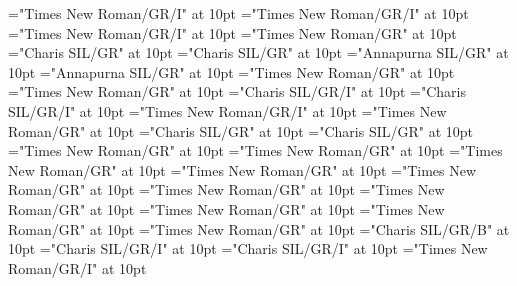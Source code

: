\documentclass[a4paper]{article}
\begin{document}
\font\grammaticalinfoentryletData="Times New Roman/GR/I" at 10pt
\font\partofspeechengrammaticalinfoentryletData="Times New Roman/GR/I" at 10pt
\font\spanenpartofspeechengrammaticalinfoentryletData="Times New Roman/GR/I" at 10pt
\font\xsensenumbersensesensesentryletData="Times New Roman/GR" at 10pt
\font\xitemteLexSensepublishStemGlossPubLdtesensesensesentryletData="Charis SIL/GR" at 10pt
\font\spantexitemteLexSensepublishStemGlossPubLdtesensesensesentryletData="Charis SIL/GR" at 10pt
\font\xitemhiLexSensepublishStemGlossPubLdtesensesensesentryletData="Annapurna SIL/GR" at 10pt
\font\spanhixitemhiLexSensepublishStemGlossPubLdtesensesensesentryletData="Annapurna SIL/GR" at 10pt
\font\examplessensesensesentryletData="Times New Roman/GR" at 10pt
\font\xitemexamplessensesensesentryletData="Times New Roman/GR" at 10pt
\font\exampleggoTeluINxitemexamplessensesensesentryletData="Charis SIL/GR/I" at 10pt
\font\spanggoTeluINexampleggoTeluINxitemexamplessensesensesentryletData="Charis SIL/GR/I" at 10pt
\font\spanenexampleggoTeluINxitemexamplessensesensesentryletData="Times New Roman/GR/I" at 10pt
\font\translationsxitemexamplessensesensesentryletData="Times New Roman/GR" at 10pt
\font\translationLdtetranslationsxitemexamplessensesensesentryletData="Charis SIL/GR" at 10pt
\font\spantetranslationLdtetranslationsxitemexamplessensesensesentryletData="Charis SIL/GR" at 10pt
\font\spanentranslationLdtetranslationsxitemexamplessensesensesentryletData="Times New Roman/GR" at 10pt
\font\spanenexamplessensesensesentryletData="Times New Roman/GR" at 10pt
\font\primaryrefsentryletData="Times New Roman/GR" at 10pt
\font\spanenprimaryrefsentryletData="Times New Roman/GR" at 10pt
\font\entryreftypeprimaryrefsentryletData="Times New Roman/GR" at 10pt
\font\LexEntryTypepublishStemEntryTypeAbbreviationPubenentryreftypeprimaryrefsentryletData="Times New Roman/GR" at 10pt
\font\spanenLexEntryTypepublishStemEntryTypeAbbreviationPubenentryreftypeprimaryrefsentryletData="Times New Roman/GR" at 10pt
\font\spanenentryreftypeprimaryrefsentryletData="Times New Roman/GR" at 10pt
\font\entryrefcomponentprimaryrefsentryletData="Times New Roman/GR" at 10pt
\font\aentryrefcomponentprimaryrefsentryletData="Times New Roman/GR" at 10pt
\font\LexEntrypublishStemComponentTargetHeadWordRefggoTeluINaentryrefcomponentprimaryrefsentryletData="Charis SIL/GR/B" at 10pt
\font\exampleggoTeluINexamplessensesensesentryletData="Charis SIL/GR/I" at 10pt
\font\spanggoTeluINexampleggoTeluINexamplessensesensesentryletData="Charis SIL/GR/I" at 10pt
\font\spanenexampleggoTeluINexamplessensesensesentryletData="Times New Roman/GR/I" at 10pt
\end{document}
